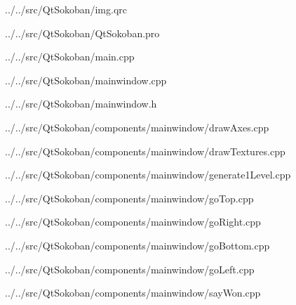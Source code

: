 
{../../src/QtSokoban/img.qrc}


{../../src/QtSokoban/QtSokoban.pro}

\newpage


{../../src/QtSokoban/main.cpp}


{../../src/QtSokoban/mainwindow.cpp}


{../../src/QtSokoban/mainwindow.h}


{../../src/QtSokoban/components/mainwindow/drawAxes.cpp}


{../../src/QtSokoban/components/mainwindow/drawTextures.cpp}


{../../src/QtSokoban/components/mainwindow/generate1Level.cpp}


{../../src/QtSokoban/components/mainwindow/goTop.cpp}


{../../src/QtSokoban/components/mainwindow/goRight.cpp}


{../../src/QtSokoban/components/mainwindow/goBottom.cpp}

\newpage


{../../src/QtSokoban/components/mainwindow/goLeft.cpp}

\newpage


{../../src/QtSokoban/components/mainwindow/sayWon.cpp}
